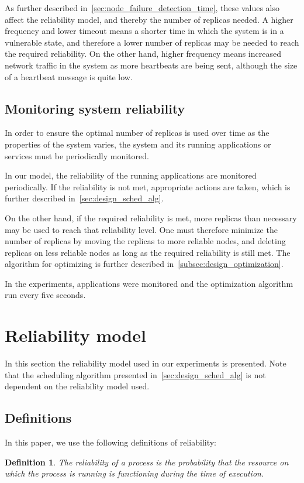 \documentclass{cslthse-msc}
\newtheorem{definition}{Definition}[chapter]
\begin{document}
As further described in~\cref{sec:node_failure_detection_time}, these values also affect the reliability model, and thereby the number of replicas needed. A higher frequency and lower timeout means a shorter time in which the system is in a vulnerable state, and therefore a lower number of replicas may be needed to reach the required reliability. On the other hand, higher frequency means increased network traffic in the system as more heartbeats are being sent, although the size of a heartbeat message is quite low. %

\subsection{Monitoring system reliability} \label{subsec:monitoring_system_rel}
In order to ensure the optimal number of replicas is used over time as the properties of the system varies, the system and its running applications or services must be periodically monitored. 

In our model, the reliability of the running applications are monitored periodically. If the reliability is not met, appropriate actions are taken, which is further described in~\cref{sec:design_sched_alg}.

On the other hand, if the required reliability is met, more replicas than necessary may be used to reach that reliability level. One must therefore minimize the number of replicas by moving the replicas to more reliable nodes, and deleting replicas on less reliable nodes as long as the required reliability is still met. The algorithm for optimizing is further described in~\cref{subsec:design_optimization}.

In the experiments, applications were monitored and the optimization algorithm run every five seconds.

\section{Reliability model} \label{sec:design_reliability_model}
In this section the reliability model used in our experiments is presented. Note that the scheduling algorithm presented in~\cref{sec:design_sched_alg} is not dependent on the reliability model used.

\subsection{Definitions} \label{subsec:design_definitions}
In this paper, we use the following definitions of reliability:
\begin{definition} \label{def:single_task_reliability}
The reliability of a process is the probability that the resource on which the process is running is functioning during the time of execution.
\end{definition}
\end{document}
